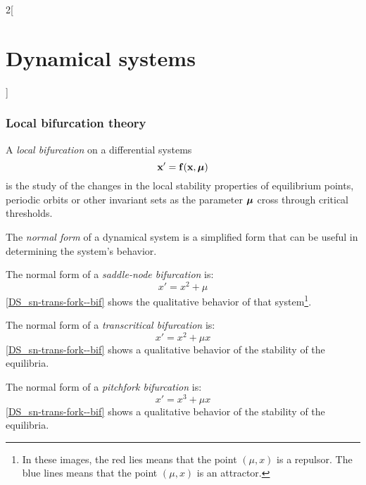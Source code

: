\documentclass[../../../main_math.tex]{subfiles}
\begin{document}
\begin{multicols}{2}[\section{Dynamical systems}]
  \subsubsection{Local bifurcation theory}
  \begin{definition}
    A \emph{local bifurcation} on a differential systems
    \begin{equation}\label{DS_mu-system}
      \boldsymbol{\mathrm{x}}'=\boldsymbol{\mathrm{f}}(\boldsymbol{\mathrm{x}},\boldsymbol{\mathrm{\mu}})
    \end{equation}
    is the study of the changes in the local stability properties of equilibrium points, periodic orbits or other invariant sets as the parameter $\boldsymbol{\mathrm{\mu}}$ cross through critical thresholds.
  \end{definition}
  \begin{definition}
    The \emph{normal form} of a dynamical system is a simplified form that can be useful in determining the system's behavior.
  \end{definition}
  \begin{definition}
    The normal form of a \emph{saddle-node bifurcation} is: $$x'=x^2+\mu$$
    \cref{DS_sn-trans-fork--bif} shows the qualitative behavior of that system\footnote{In these images, the red lies means that the point $(\mu,x)$ is a repulsor. The blue lines means that the point $(\mu,x)$ is an attractor.}.
  \end{definition}
  \begin{definition}
    The normal form of a \emph{transcritical bifurcation} is: $$x'=x^2+\mu x$$
    \cref{DS_sn-trans-fork--bif} shows a qualitative behavior of the stability of the equilibria.
  \end{definition}
  \begin{definition}
    The normal form of a \emph{pitchfork bifurcation} is: $$x'=x^3+\mu x$$
    \cref{DS_sn-trans-fork--bif} shows a qualitative behavior of the stability of the equilibria.
  \end{definition}
  \begin{center}
    \begin{minipage}{0.32\linewidth}
      \centering
      
    \end{minipage}\hfill
    \begin{minipage}{0.32\linewidth}
      \centering
      

\end{minipage}
\end{center}
\end{multicols}
\end{document}
